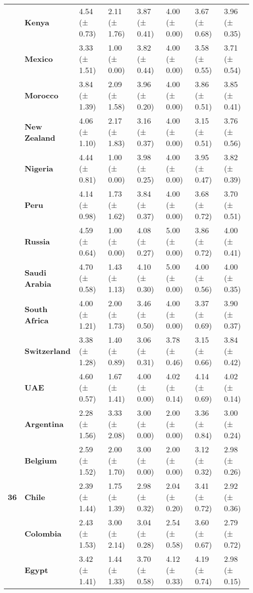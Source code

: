 \begin{tabular}{llllllll}
\textbf{} & \textbf{Kenya} & 4.54 (± 0.73) & 2.11 (± 1.76) & 3.87 (± 0.41) & 4.00 (± 0.00) & 3.67 (± 0.68) & 3.96 (± 0.35) \\
\textbf{} & \textbf{Mexico} & 3.33 (± 1.51) & 1.00 (± 0.00) & 3.82 (± 0.44) & 4.00 (± 0.00) & 3.58 (± 0.55) & 3.71 (± 0.54) \\
\textbf{} & \textbf{Morocco} & 3.84 (± 1.39) & 2.09 (± 1.58) & 3.96 (± 0.20) & 4.00 (± 0.00) & 3.86 (± 0.51) & 3.85 (± 0.41) \\
\textbf{} & \textbf{New Zealand} & 4.06 (± 1.10) & 2.17 (± 1.83) & 3.16 (± 0.37) & 4.00 (± 0.00) & 3.15 (± 0.51) & 3.76 (± 0.56) \\
\textbf{} & \textbf{Nigeria} & 4.44 (± 0.81) & 1.00 (± 0.00) & 3.98 (± 0.25) & 4.00 (± 0.00) & 3.95 (± 0.47) & 3.82 (± 0.39) \\
\textbf{} & \textbf{Peru} & 4.14 (± 0.98) & 1.73 (± 1.62) & 3.84 (± 0.37) & 4.00 (± 0.00) & 3.68 (± 0.72) & 3.70 (± 0.51) \\
\textbf{} & \textbf{Russia} & 4.59 (± 0.64) & 1.00 (± 0.00) & 4.08 (± 0.27) & 5.00 (± 0.00) & 3.86 (± 0.72) & 4.00 (± 0.41) \\
\textbf{} & \textbf{Saudi Arabia} & 4.70 (± 0.58) & 1.43 (± 1.13) & 4.10 (± 0.30) & 5.00 (± 0.00) & 4.00 (± 0.56) & 4.00 (± 0.35) \\
\textbf{} & \textbf{South Africa} & 4.00 (± 1.21) & 2.00 (± 1.73) & 3.46 (± 0.50) & 4.00 (± 0.00) & 3.37 (± 0.69) & 3.90 (± 0.37) \\
\textbf{} & \textbf{Switzerland} & 3.38 (± 1.28) & 1.40 (± 0.89) & 3.06 (± 0.31) & 3.78 (± 0.46) & 3.15 (± 0.66) & 3.84 (± 0.42) \\
\textbf{} & \textbf{UAE} & 4.60 (± 0.57) & 1.67 (± 1.41) & 4.00 (± 0.00) & 4.02 (± 0.14) & 4.14 (± 0.69) & 4.02 (± 0.14) \\
\cline{1-8}
\multirow[t]{19}{*}{\textbf{36}} & \textbf{Argentina} & 2.28 (± 1.56) & 3.33 (± 2.08) & 3.00 (± 0.00) & 2.00 (± 0.00) & 3.36 (± 0.84) & 3.00 (± 0.24) \\
\textbf{} & \textbf{Belgium} & 2.59 (± 1.52) & 2.00 (± 1.70) & 3.00 (± 0.00) & 2.00 (± 0.00) & 3.12 (± 0.32) & 2.98 (± 0.26) \\
\textbf{} & \textbf{Chile} & 2.39 (± 1.44) & 1.75 (± 1.39) & 2.98 (± 0.32) & 2.04 (± 0.20) & 3.41 (± 0.72) & 2.92 (± 0.36) \\
\textbf{} & \textbf{Colombia} & 2.43 (± 1.53) & 3.00 (± 2.14) & 3.04 (± 0.28) & 2.54 (± 0.58) & 3.60 (± 0.67) & 2.79 (± 0.72) \\
\textbf{} & \textbf{Egypt} & 3.42 (± 1.41) & 1.44 (± 1.33) & 3.70 (± 0.58) & 4.12 (± 0.33) & 4.19 (± 0.74) & 2.98 (± 0.15) \\

\end{tabular}

